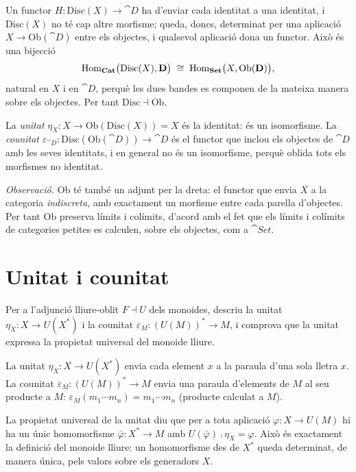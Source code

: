 \begin{solucio}
Un functor $H\colon\mathrm{Disc}(X)\to\cat{D}$ ha d'enviar cada identitat a una identitat, i $\mathrm{Disc}(X)$ no té cap altre morfisme; queda, doncs, determinat per una aplicació $X\to\mathrm{Ob}(\cat{D})$ entre els objectes, i qualsevol aplicació dona un functor. Això és una bijecció
\[
\operatorname{Hom}_{\mathbf{Cat}}\bigl(\mathrm{Disc}(X),\mathbf{D}\bigr)\;\cong\;\operatorname{Hom}_{\mathbf{Set}}\bigl(X,\mathrm{Ob}(\mathbf{D})\bigr),
\]
natural en $X$ i en $\cat{D}$, perquè les dues bandes es componen de la mateixa manera sobre els objectes. Per tant $\mathrm{Disc}\dashv\mathrm{Ob}$.

La \emph{unitat} $\eta_X\colon X\to\mathrm{Ob}(\mathrm{Disc}(X))=X$ és la identitat: és un isomorfisme. La \emph{counitat} $\varepsilon_{\cat{D}}\colon\mathrm{Disc}(\mathrm{Ob}(\cat{D}))\to\cat{D}$ és el functor que inclou els objectes de $\cat{D}$ amb les seves identitats, i en general no és un isomorfisme, perquè oblida tots els morfismes no identitat.

\emph{Observació.} $\mathrm{Ob}$ té també un adjunt per la dreta: el functor que envia $X$ a la categoria \emph{indiscreta}, amb exactament un morfisme entre cada parella d'objectes. Per tant $\mathrm{Ob}$ preserva límits i colímits, d'acord amb el fet que els límits i colímits de categories petites es calculen, sobre els objectes, com a $\cat{Set}$.
\end{solucio}

\section{Unitat i counitat}

\begin{exercici}
Per a l'adjunció lliure-oblit $F\dashv U$ dels monoides, descriu la unitat $\eta_X\colon X\to U(X^*)$ i la counitat $\varepsilon_M\colon (U(M))^*\to M$, i comprova que la unitat expressa la propietat universal del monoide lliure.
\end{exercici}

\begin{solucio}
La unitat $\eta_X\colon X\to U(X^*)$ envia cada element $x$ a la paraula d'una sola lletra $x$. La counitat $\varepsilon_M\colon (U(M))^*\to M$ envia una paraula d'elements de $M$ al seu producte a $M$: $\varepsilon_M(m_1\cdots m_n)=m_1\cdots m_n$ (producte calculat a $M$).

La propietat universal de la unitat diu que per a tota aplicació $\varphi\colon X\to U(M)$ hi ha un únic homomorfisme $\bar\varphi\colon X^*\to M$ amb $U(\bar\varphi)\comp\eta_X=\varphi$. Això és exactament la definició del monoide lliure: un homomorfisme des de $X^*$ queda determinat, de manera única, pels valors sobre els generadors $X$.
\end{solucio}

